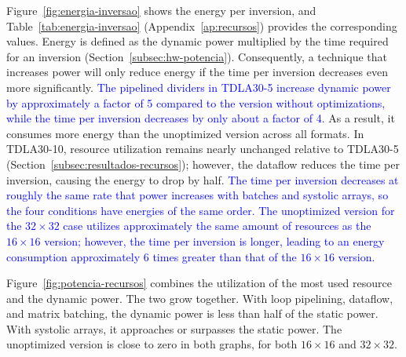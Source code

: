 Figure~\ref{fig:energia-inversao} shows the energy per inversion, and Table~\ref{tab:energia-inversao} (Appendix~\ref{ap:recursos}) provides the corresponding values. Energy is defined as the dynamic power multiplied by the time required for an inversion (Section~\ref{subsec:hw-potencia}). Consequently, a technique that increases power will only reduce energy if the time per inversion decreases even more significantly. \textcolor{blue}{The pipelined dividers in TDLA30-5 increase dynamic power by approximately a factor of 5 compared to the version without optimizations, while the time per inversion decreases by only about a factor of 4.} As a result, it consumes more energy than the unoptimized version across all formats. In TDLA30-10, resource utilization remains nearly unchanged relative to TDLA30-5 (Section~\ref{subsec:resultados-recursos}); however, the dataflow reduces the time per inversion, causing the energy to drop by half. \textcolor{blue}{The time per inversion decreases at roughly the same rate that power increases with batches and systolic arrays, so the four conditions have energies of the same order.} \textcolor{blue}{The unoptimized version for the $32 \times 32$ case utilizes approximately the same amount of resources as the $16 \times 16$ version; however, the time per inversion is longer, leading to an energy consumption approximately 6 times greater than that of the $16 \times 16$ version.}

Figure~\ref{fig:potencia-recursos} combines the utilization of the most used resource and the dynamic power. The two grow together. With loop pipelining, dataflow, and matrix batching, the dynamic power is less than half of the static power. With systolic arrays, it approaches or surpasses the static power. The unoptimized version is close to zero in both graphs, for both $16 \times 16$ and $32 \times 32$.

